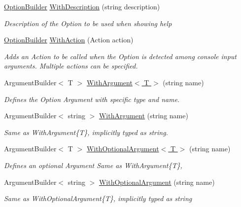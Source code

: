\begin{DoxyCompactItemize}
\hyperlink{class_arguments_library_1_1_builders_1_1_option_builder}{Option\+Builder} \hyperlink{class_arguments_library_1_1_builders_1_1_option_builder_acf6d150980aab12d911b78892562136f}{With\+Description} (string description)
\begin{DoxyCompactList}\small\item\em Description of the Option to be used when showing help \end{DoxyCompactList}\item 
\hyperlink{class_arguments_library_1_1_builders_1_1_option_builder}{Option\+Builder} \hyperlink{class_arguments_library_1_1_builders_1_1_option_builder_ad72ffd5950e6c2d5d67baa8c07545f4e}{With\+Action} (Action action)
\begin{DoxyCompactList}\small\item\em Adds an Action to be called when the Option is detected among console input arguments. Multiple actions can be specified. \end{DoxyCompactList}\item 
Argument\+Builder$<$ T $>$ \hyperlink{class_arguments_library_1_1_builders_1_1_option_builder_a7ef1bfac45f048ca3f694079db784821}{With\+Argument$<$ T $>$} (string name)
\begin{DoxyCompactList}\small\item\em Defines the Option Argument with specific type and name. \end{DoxyCompactList}\item 
Argument\+Builder$<$ string $>$ \hyperlink{class_arguments_library_1_1_builders_1_1_option_builder_a994274983f42d7a8a4a3f00a928ce50b}{With\+Argument} (string name)
\begin{DoxyCompactList}\small\item\em Same as With\+Argument\{\+T\}, implicitly typed as string. \end{DoxyCompactList}\item 
Argument\+Builder$<$ T $>$ \hyperlink{class_arguments_library_1_1_builders_1_1_option_builder_a671ec77a1bf3044a86242966c5b492cc}{With\+Optional\+Argument$<$ T $>$} (string name)
\begin{DoxyCompactList}\small\item\em Defines an optional Argument Same as With\+Argument\{\+T\}, \end{DoxyCompactList}\item 
Argument\+Builder$<$ string $>$ \hyperlink{class_arguments_library_1_1_builders_1_1_option_builder_aaed523e2969b04dcb2757f730bc1a06b}{With\+Optional\+Argument} (string name)
\begin{DoxyCompactList}\small\item\em Same as With\+Optional\+Argument\{\+T\}, implicitly typed as string\end{DoxyCompactList}\end{DoxyCompactItemize}


